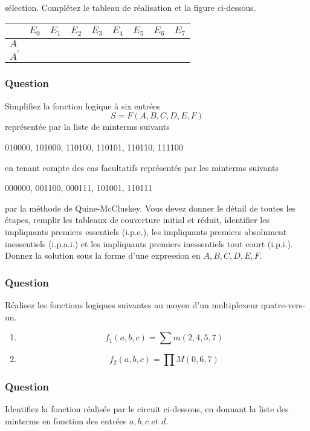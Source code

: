\documentclass[11pt]{article}
\begin{document}
sélection. Complétez le tableau de réalisation et la figure
ci-dessous.
\begin{center}
\begin{tabular}{lllllllll}
 & \(E_0\) & \(E_1\) & \(E_2\) & \(E_3\) & \(E_4\) & \(E_5\) & \(E_6\) & \(E_7\)\\[0pt]
\hline
\(A\) &  &  &  &  &  &  &  & \\[0pt]
\(A^\prime\) &  &  &  &  &  &  &  & \\[0pt]
\end{tabular}
\end{center}
\begin{center}

\end{center}

\subsubsection*{Question}
\label{sec:orgc4d4443}
Simplifiez la fonction logique à six entrées
  $$
    S = F(A,B,C,D,E,F)
    $$
  représentée par la liste de minterms suivants

010000, 101000, 110100, 110101, 110110, 111100

en tenant compte des cas facultatifs représentés par les minterms
suivants

000000, 001100, 000111, 101001, 110111

par la méthode de Quine-McCluskey. Vous devez donner le détail de
toutes les étapes, remplir les tableaux de couverture initial et
réduit, identifier les impliquants premiers essentiels (i.p.e.), les
impliquants premiers absolument inessentiels (i.p.a.i.) et les
impliquants premiers inessentiels tout court (i.p.i.). Donnez la
solution sous la forme d'une expression en \(A,B,C,D,E,F\).

\subsubsection*{Question}
\label{sec:org48f93a1}
Réalisez les fonctions logiques suivantes au moyen d'un multiplexeur
  quatre-vers-un.

\begin{enumerate}
\item $$f_1(a,b,c) = \sum m(2, 4, 5, 7)$$

\item $$f_2(a,b,c) = \prod M(0, 6, 7)$$
\end{enumerate}

\subsubsection*{Question}
\label{sec:org92defdd}
Identifiez la fonction réalisée par le circuit ci-dessous, en donnant
  la liste des minterms en fonction des entrées \(a, b, c\) et \(d\).
\begin{center}

\end{center}
\end{document}
